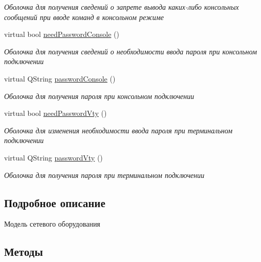 \begin{DoxyCompactItemize}
\begin{DoxyCompactList}\small\item\em Оболочка для получения сведений о запрете вывода каких-\/либо консольных сообщений при вводе команд в консольном режиме \end{DoxyCompactList}\item 
virtual bool \hyperlink{class_network_equipment_model_ada70138a6ca4a8ad1bd07fa48998c9d8}{need\+Password\+Console} ()
\begin{DoxyCompactList}\small\item\em Оболочка для получения сведений о необходимости ввода пароля при консольном подключении \end{DoxyCompactList}\item 
virtual Q\+String \hyperlink{class_network_equipment_model_a34400a7581340c475357034e3b183e5c}{password\+Console} ()
\begin{DoxyCompactList}\small\item\em Оболочка для получения пароля при консольном подключении \end{DoxyCompactList}\item 
virtual bool \hyperlink{class_network_equipment_model_aba3aec560271bbf72ee93fdf5e4c3a2e}{need\+Password\+Vty} ()
\begin{DoxyCompactList}\small\item\em Оболочка для изменения необходимости ввода пароля при терминальном подключении \end{DoxyCompactList}\item 
virtual Q\+String \hyperlink{class_network_equipment_model_a066e6c334dcf83f5f2646be4f8f19299}{password\+Vty} ()
\begin{DoxyCompactList}\small\item\em Оболочка для получения пароля при терминальном подключении \end{DoxyCompactList}\end{DoxyCompactItemize}


\subsection{Подробное описание}
Модель сетевого оборудования 

\subsection{Методы}
